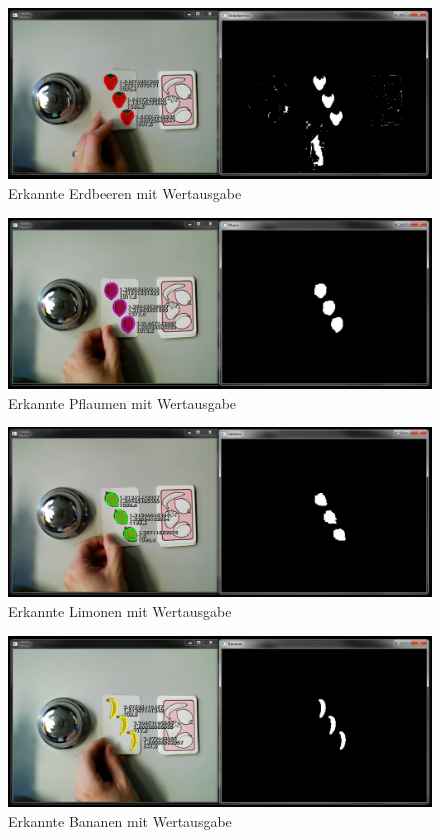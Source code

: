 \begin{figure}[H]
    \centering
    \includegraphics[width=\textwidth]{Abbildungen/Erdbeeren03}
    \caption[ ]{Erkannte Erdbeeren mit Wertausgabe}
    \label{fig:Erdbeeren03}
\end{figure}
\begin{figure}[H]
    \centering
    \includegraphics[width=\textwidth]{Abbildungen/Pflaumen03}
    \caption[ ]{Erkannte Pflaumen mit Wertausgabe}
    \label{fig:Pflaumen03}
\end{figure}
\begin{figure}[H]
    \centering
    \includegraphics[width=\textwidth]{Abbildungen/Limetten03}
    \caption[ ]{Erkannte Limonen mit Wertausgabe}
    \label{fig:Limetten03}
\end{figure}
\begin{figure}[H]
    \centering
    \includegraphics[width=\textwidth]{Abbildungen/Bananen03}
    \caption[ ]{Erkannte Bananen mit Wertausgabe}
    \label{fig:Bananen03}
\end{figure}

